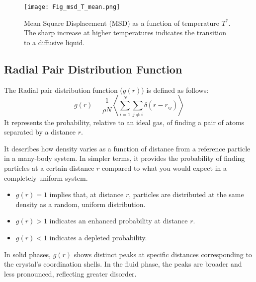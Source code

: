 \documentclass{article}
\begin{document}
\begin{figure}[h!]
    \centering
    \texttt{[image: Fig\_msd\_T\_mean.png]}
    \caption{Mean Square Displacement (MSD) as a function of temperature $T^*$. The sharp increase at higher temperatures indicates the transition to a diffusive liquid.}
    \label{fig:msd_vs_temp}
\end{figure}

\subsection{Radial Pair Distribution Function}


The Radial pair distribution function ($g(r)$) is defined as follows:
$$
g(r) = \frac{1}{\rho N}\left\langle\sum_{i=1}^N\sum_{j\neq i}\delta(r-r_{ij})\right\rangle
$$
It represents the probability, relative to an ideal gas, of finding a pair of atoms separated by a distance $r$.

It describes how density varies as a function of distance from a reference particle in a many-body system. In simpler terms, it provides the probability of finding particles at a certain distance $r$ compared to what you would expect in a completely uniform system.
\begin{itemize}
    \item $g(r)=1$ implies that, at distance $r$, particles are distributed at the same density as a random, uniform distribution.
    \item $g(r)>1$ indicates an enhanced probability at distance $r$.
    \item $g(r)<1$ indicates a depleted probability.
\end{itemize}
In solid phases, $g(r)$ shows distinct peaks at specific distances corresponding to the crystal's coordination shells. In the fluid phase, the peaks are broader and less pronounced, reflecting greater disorder.
\end{document}
